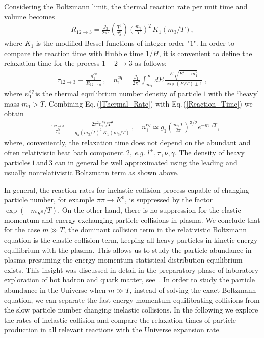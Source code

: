 Considering the Boltzmann limit, the thermal reaction rate per unit time and volume becomes
\begin{align}
\label{Thermal_Rate}
R_{12\rightarrow3}=\frac{g_3}{2\pi^2}\left(\frac{T^3}{\tau^0_3}\right)\left(\frac{m_3}{T}\right)^2\,K_1(m_3/T),
\end{align}
where $K_1$ is the modified Bessel functions of integer order "$1$". In order to compare the reaction time with Hubble time $1/H$, it is convenient to define the relaxation time for the process $1+2\rightarrow 3$ as follows:
\begin{align}
\label{Reaction_Time}
\tau_{12\rightarrow 3}\equiv\frac{n^{eq}_{1}}{R_{12\rightarrow n}}\,,\quad
n^{eq}_1=\frac{g_1}{2\pi^2}\int_{m_1}^\infty\!\!\!\!dE\,\frac{E\,\sqrt{E^2-m_1^2}}{\exp{\left(E/T\right)}\pm1}\;, 
\end{align}
where $n^{eq}_1$\,is the thermal equilibrium number density of particle\,$1$ with the `heavy' mass $m_1>T$.  Combining Eq.\,(\ref{Thermal_Rate}) with  Eq.\,(\ref{Reaction_Time}) we obtain
\begin{align}\label{RelaxationTime}
&\frac{\tau_{12\rightarrow3}}{ \tau^0_3}=  
\frac{2\pi^2 n^{eq}_1/T^3}{g_3(m_3/T)^2\,K_1(m_3/T)}\,, \quad 
n^{eq}_1\simeq g_1\left(\frac{m_1 T}{2\pi}\right)^{3/2}e^{-m_1/T},
\end{align}
where, conveniently, the relaxation time does not depend on the abundant and often relativistic heat bath component $2$, {\it e.g.\/} $l^\pm,\pi,\nu,\gamma$. The density of heavy particles\,$1$\,and\,$3$ can in general be well approximated using the leading and usually nonrelativistic Boltzmann term as shown above.

In general, the reaction rates for inelastic collision process capable of changing particle number, for example $\pi\pi\to K^0$, is suppressed by the factor $\exp{(-m_{K^0}/T)}$. On the other hand, there is no suppression for the elastic momentum and energy exchanging particle collisions in plasma. We conclude that for the case $m\gg T$, the dominant collision term in the relativistic Boltzmann equation is the elastic collision term, keeping all heavy particles in kinetic energy equilibrium with the plasma. This allows us to study the particle abundance in plasma presuming the energy-momentum statistical distribution equilibrium exists. This insight was discussed in detail in the preparatory phase of laboratory exploration of hot hadron and quark matter, see~\cite{Koch:1986ud}. In order to study the particle abundance in the Universe when $m\gg T$, instead of solving the exact Boltzmann equation, we can separate the fast energy-momentum equilibrating collisions from the slow particle number changing inelastic collisions. In the following we explore the rates of inelastic collision and compare the relaxation times of particle production in all relevant reactions with the Universe expansion rate.



